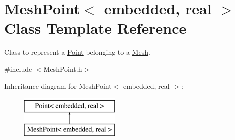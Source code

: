 \hypertarget{class_mesh_point}{\section{\-Mesh\-Point$<$ embedded, real $>$ \-Class \-Template \-Reference}
\label{class_mesh_point}
}


\-Class to represent a \hyperlink{class_point}{\-Point} belonging to a \hyperlink{class_mesh}{\-Mesh}.  




{\ttfamily \#include $<$\-Mesh\-Point.\-h$>$}

\-Inheritance diagram for \-Mesh\-Point$<$ embedded, real $>$\-:\begin{figure}[H]
\begin{center}
\leavevmode
\includegraphics[height=2.000000cm]{class_mesh_point}
\end{center}
\end{figure}
